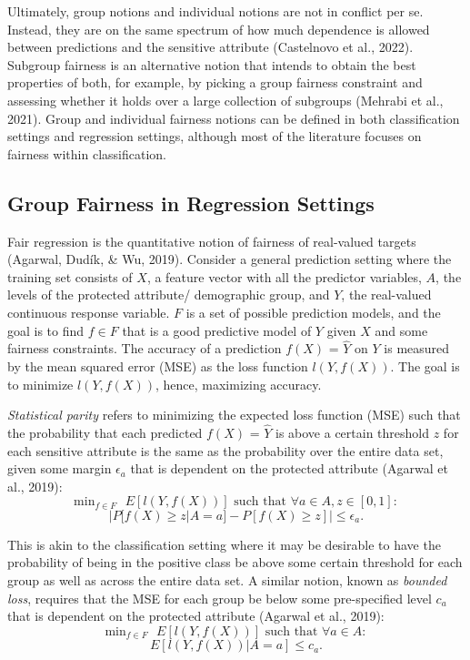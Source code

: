 \documentclass[12pt, twoside]{amherstthesis}
\begin{document}
Ultimately, group notions and individual notions are not in conflict per se. Instead, they are on the same spectrum of how much dependence is allowed between predictions and the sensitive attribute (Castelnovo et al., 2022). Subgroup fairness is an alternative notion that intends to obtain the best properties of both, for example, by picking a group fairness constraint and assessing whether it holds over a large collection of subgroups (Mehrabi et al., 2021). Group and individual fairness notions can be defined in both classification settings and regression settings, although most of the literature focuses on fairness within classification.

\hypertarget{group-fairness-in-regression-settings}{%
\subsection{Group Fairness in Regression Settings}\label{group-fairness-in-regression-settings}}

Fair regression is the quantitative notion of fairness of real-valued targets (Agarwal, Dudík, \& Wu, 2019). Consider a general prediction setting where the training set consists of \(X\), a feature vector with all the predictor variables, \(A\), the levels of the protected attribute/ demographic group, and \(Y\), the real-valued continuous response variable. \(F\) is a set of possible prediction models, and the goal is to find \(f \in F\) that is a good predictive model of \(Y\) given \(X\) and some fairness constraints. The accuracy of a prediction \(f(X)\) = \(\hat{Y}\) on \(Y\) is measured by the mean squared error (MSE) as the loss function \(l(Y, f(X))\). The goal is to minimize \(l(Y, f(X))\), hence, maximizing accuracy.

\emph{Statistical parity} refers to minimizing the expected loss function (MSE) such that the probability that each predicted \(f(X)\) = \(\hat{Y}\) is above a certain threshold \(z\) for each sensitive attribute is the same as the probability over the entire data set, given some margin \(\epsilon_a\) that is dependent on the protected attribute (Agarwal et al., 2019):
\begin{equation}
\label{ch1eq1}
\text{min}_{f \in F} \text{ } E[l(Y, f(X))] \text{ such that } \forall a \in A, z \in [0,1]:
\end{equation}
\[ |P[f(X) \geq z | A = a] - P[f(X) \geq z]| \leq \epsilon_a.\]

This is akin to the classification setting where it may be desirable to have the probability of being in the positive class be above some certain threshold for each group as well as across the entire data set. A similar notion, known as \emph{bounded loss}, requires that the MSE for each group be below some pre-specified level \(c_a\) that is dependent on the protected attribute (Agarwal et al., 2019):
\begin{equation}
\label{ch1eq2}
\text{min}_{f \in F} \text{ } E[l(Y, f(X))] \text{ such that } \forall a \in A: 
\end{equation}
\[ E[l(Y, f(X)) | A = a] \leq c_a.\]
\end{document}
